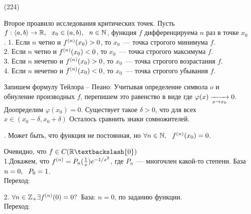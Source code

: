 (224)

\T \q Второе проавило исследования критических точек. Пусть $f: \langle a, b \rangle \to \mathbb{R},\ \  x_0\in(a, b),\ \  n \in \mathbb{N}$, функция $f$ дифференцируема $n$ раз в точке $x_0$. 
1. Если $n$ четно и $f^{(n)}(x_0) > 0$, то $x_0$~--- точка строгого минимума $f$.\\
2. Если $n$ четно и $f^{(n)}(x_0) < 0$, то $x_0$~--- точка строгого максимума $f$.\\
3. Если $n$ нечетно и $f^{(n)}(x_0) > 0$, то $x_0$~--- точка строгого возрастания $f$.\\
4. Если $n$ нечетно и $f^{(n)}(x_0) < 0$, то $x_0$~--- точка строгого убывания $f$.

\D Запишем формулу Тейлора -- Пеано:  Учитывая определение символа $o$ и обнуление производных $f$, перепишем это равенство в виде  где $\varphi(x) \xrightarrow[x \to x_0]{} 0$. Доопределим $\varphi(x_0) = 0$. Существует такое $\delta > 0$, что для всех $x \in (x_0 - \delta, x_0 + \delta)$  Осталось сравнить знаки сомножителей.

\Zam. Может быть, что функция не постоянная, но $\forall n \in \mathbb{N},\ \  f^{(n)}(x_0) = 0$.  

\D Очевидно, что $f \in C(\R \bsl\{0\})$\\
1.Докажем, что $f^{(n)} = P_n(\frac 1x)e^{-1/x^2}$, где $P_n$~--- многочлен какой-то степени. База $n = 0,\ \  P_0 = 1$.\\
Переход:  

2. $\forall n \in \mathbb{Z}_+ \exists f^{(n)}(0) = 0?$\
База: $n = 0$, по заданию функции.\\
Переход: 